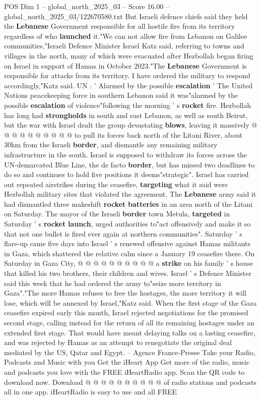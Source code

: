 \begin{textsample}{POS Dim 1 – global\_north\_2025\_03 – Score 16.00 – global\_north\_2025\_03/122670580.txt}
But Israeli defence chiefs said they held the \textbf{Lebanese} Government responsible for all hostile fire from its territory regardless of who \textbf{launched} it."We can not allow fire from Lebanon on Galilee communities,"Israeli Defence Minister Israel Katz said, referring to towns and villages in the north, many of which were evacuated after Hezbollah began firing on Israel in support of Hamas in October 2023."The \textbf{Lebanese} Government is responsible for attacks from its territory.
I have ordered the military to respond accordingly,"Katz said.
UN : ' Alarmed by the possible \textbf{escalation} ' The United Nations peacekeeping force in southern Lebanon said it was"alarmed by the possible \textbf{escalation} of violence"following the morning ' s \textbf{rocket} fire.
Hezbollah has long had \textbf{strongholds} in south and east Lebanon, as well as south Beirut, but the war with Israel dealt the group devastating \textbf{blows}, leaving it massively @ @ @ @ @ @ @ @ @ @ to pull its forces back north of the Litani River, about 30km from the Israeli \textbf{border}, and dismantle any remaining military infrastructure in the south.
Israel is supposed to withdraw its forces across the UN-demarcated Blue Line, the de facto \textbf{border}, but has missed two deadlines to do so and continues to hold five positions it deems"strategic".
Israel has carried out repeated airstrikes during the ceasefire, \textbf{targeting} what it said were Hezbollah military sites that violated the agreement.
The \textbf{Lebanese} army said it had dismantled three makeshift \textbf{rocket} \textbf{batteries} in an area north of the Litani on Saturday.
The mayor of the Israeli \textbf{border} town Metula, \textbf{targeted} in Saturday ' s \textbf{rocket} \textbf{launch}, urged authorities to"act offensively and make it so that not one bullet is fired ever again at northern communities".
Saturday ' s flare-up came five days into Israel ' s renewed offensive against Hamas militants in Gaza, which shattered the relative calm since a January 19 ceasefire there.
On Saturday in Gaza City, @ @ @ @ @ @ @ @ @ @ a \textbf{strike} on his family ' s house that killed his two brothers, their children and wives.
Israel ' s Defence Minister said this week that he had ordered the army to"seize more territory in Gaza"."The more Hamas refuses to free the hostages, the more territory it will lose, which will be annexed by Israel,"Katz said.
When the first stage of the Gaza ceasefire expired early this month, Israel rejected negotiations for the promised second stage, calling instead for the return of all its remaining hostages under an extended first stage.
That would have meant delaying talks on a lasting ceasefire, and was rejected by Hamas as an attempt to renegotiate the original deal mediated by the US, Qatar and Egypt. -- Agence France-Presse Take your Radio, Podcasts and Music with you Get the iHeart App Get more of the radio, music and podcasts you love with the FREE iHeartRadio app.
Scan the QR code to download now.
Download @ @ @ @ @ @ @ @ @ @ of radio stations and podcasts all in one app. iHeartRadio is easy to use and all FREE


\end{textsample}
